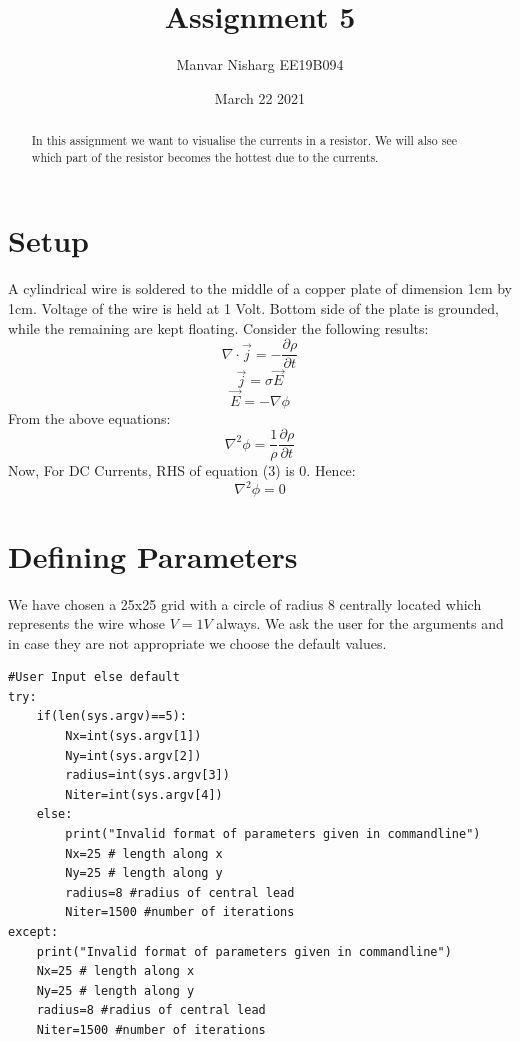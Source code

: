 \documentclass[11pt, a4paper]{article}
\title{Assignment 5}
\author{Manvar Nisharg EE19B094}
\date{March 22 2021}
\begin{document}
\maketitle
\newpage

\begin{abstract}
    In this assignment we want to visualise the currents in a resistor. We will also see which part of the resistor becomes the hottest due to the currents.
\end{abstract}


\section{Setup}
A  cylindrical wire is soldered to the middle of a copper plate of dimension 1cm by 1cm. Voltage of the wire is held at 1 Volt.  Bottom side of the plate is grounded, while the remaining are kept floating.\newline\newline
Consider the following results:\newline
\begin{equation}
    \nabla \cdot \vec{j} = - \frac{\partial\rho}{\partial t}
\end{equation}
\begin{equation}
    \vec{j} = \sigma\vec{E}
\end{equation}
\begin{equation}
    \vec{E} = -\nabla\phi
\end{equation}
From the above equations:
\begin{equation}
    \nabla^2 \phi =  \frac{1}{\rho}\frac{\partial\rho}{\partial t}
\end{equation}
Now, For DC Currents, RHS of equation (3) is 0. Hence:
\begin{equation}\label{eqn(5)}
    \nabla^2 \phi =  0
\end{equation}


\section{Defining Parameters}
We have chosen a 25x25 grid with a circle of radius 8 centrally located which represents the wire whose $V = 1V$ always. We ask the user for the arguments and in case they are not appropriate we choose the default values.

\begin{lstlisting}
#User Input else default
try:
    if(len(sys.argv)==5):
        Nx=int(sys.argv[1])
        Ny=int(sys.argv[2])
        radius=int(sys.argv[3])  
        Niter=int(sys.argv[4])
    else:
        print("Invalid format of parameters given in commandline")
        Nx=25 # length along x
        Ny=25 # length along y
        radius=8 #radius of central lead
        Niter=1500 #number of iterations
except:
    print("Invalid format of parameters given in commandline")
    Nx=25 # length along x
    Ny=25 # length along y
    radius=8 #radius of central lead
    Niter=1500 #number of iterations
\end{lstlisting}
\end{document}
